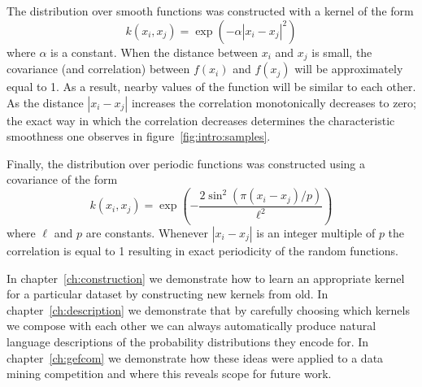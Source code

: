 The distribution over smooth functions was constructed with a kernel of the form
\[
  k(x_i, x_j) = \exp(-\alpha|x_i - x_j|^2)
\]
where $\alpha$ is a constant.
When the distance between $x_i$ and $x_j$ is small, the covariance (and correlation) between $f(x_i)$ and $f(x_j)$ will be approximately equal to 1.
As a result, nearby values of the function will be similar to each other.
As the distance $|x_i - x_j|$ increases the correlation monotonically decreases to zero; the exact way in which the correlation decreases determines the characteristic smoothness one observes in figure~\ref{fig:intro:samples}.

Finally, the distribution over periodic functions was constructed using a covariance of the form
\[
  k(x_i, x_j) = \exp\left(-\frac{2\sin^2 (\pi(x_i - x_j)/p)}{\ell^2}\right)
\]
where $\ell$ and $p$ are constants.
Whenever $|x_i - x_j|$ is an integer multiple of $p$ the correlation is equal to 1 resulting in exact periodicity of the random functions.

In chapter~\ref{ch:construction} we demonstrate how to learn an appropriate kernel for a particular dataset by constructing new kernels from old.
In chapter~\ref{ch:description} we demonstrate that by carefully choosing which kernels we compose with each other we can always automatically produce natural language descriptions of the probability distributions they encode for.
In chapter~\ref{ch:gefcom} we demonstrate how these ideas were applied to a data mining competition and where this reveals scope for future work.

\outbpdocument{


}


